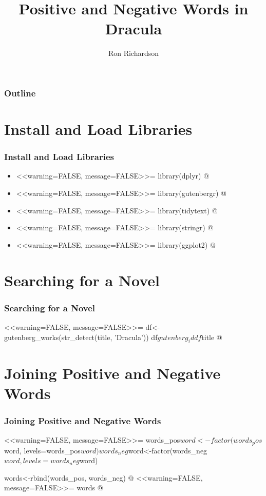 \documentclass{beamer}
\begin{document}


\title{Positive and Negative Words in Dracula}
\author{Ron Richardson}

\begin{frame}
  \titlepage
\end{frame}

\begin{frame}
  \frametitle{Outline}
    \tableofcontents
\end{frame}

\section{Install and Load Libraries}
\begin{frame}[fragile]
  \frametitle{Install and Load Libraries}
    \begin{itemize}
      \item<1->
      <<warning=FALSE, message=FALSE>>=
      library(dplyr)
      @
      \item<2->
      <<warning=FALSE, message=FALSE>>=
      library(gutenbergr)
      @
      \item<3->
      <<warning=FALSE, message=FALSE>>=
      library(tidytext)
      @
      \item<4->
      <<warning=FALSE, message=FALSE>>=
      library(stringr)
      @
      \item<5->
      <<warning=FALSE, message=FALSE>>=
      library(ggplot2)
      @
    \end{itemize}
\end{frame}

\section{Searching for a Novel}
\begin{frame}[fragile]
  \frametitle{Searching for a Novel}
  <<warning=FALSE, message=FALSE>>=
  df<-gutenberg_works(str_detect(title, 'Dracula'))
  df$gutenberg_id
  df$title
  @
\end{frame}

\section{Joining Positive and Negative Words}
\begin{frame}
  \frametitle{Joining Positive and Negative Words}
  <<warning=FALSE, message=FALSE>>=
  words_pos$word<-factor(words_pos$word, levels=words_pos$word)
  words_neg$word<-factor(words_neg$word, levels=words_neg$word)
  
  words<-rbind(words_pos, words_neg)
  @
  \framebreak
  <<warning=FALSE, message=FALSE>>=
  words
  @
\end{frame}
\end{document}
